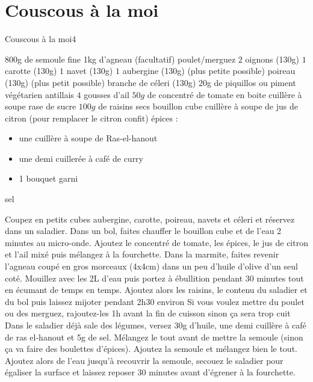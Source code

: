 {\section{Couscous à la moi}
\begin{recette}{Couscous à la moi}{4}{}{}
\begin{ingredients}[8 pers.]
\ingredient 800g de semoule fine
\ingredient 1kg d'agneau
\ingredient (facultatif) poulet/merguez
\ingredient $2$ oignons (130g)
\ingredient $1$ carotte (130g)
\ingredient $1$ navet (130g)
\ingredient $1$ aubergine (130g) (plus petite possible)
 poireau (130g)  (plus petit possible)
 branche de céleri (130g)
\ingredient[falcultatif] 20g de piquillos ou piment végétarien antillais
\ingredient $4$ gousses d'ail
\ingredient $50\unit{g}$ de concentré de tomate en boite %
 cuillère à soupe rase de sucre
\ingredient $100\unit{g}$ de raisins secs
 bouillon cube
 cuillère à soupe de jus de citron (pour remplacer le citron confit)
\ingredient épices : \begin{itemize}
		\item une cuillère à soupe de Ras-el-hanout
		\item une demi cuillerée à café de curry
		\item 1 bouquet garni
		\end{itemize}
\ingredient sel
\end{ingredients}

\begin{preparation}
\etape Coupez en petits cubes aubergine, carotte, poireau, navets et céleri et réservez dans un saladier.
\etape Dans un bol, faites chauffer le bouillon cube et de l'eau 2 minutes au micro-onde. Ajoutez le concentré de tomate, les épices, le jus de citron et l'ail mixé puis mélangez à la fourchette. 
\etape Dans la marmite, faites revenir l'agneau coupé en gros morceaux (4x4cm) dans un peu d'huile d'olive d'un seul coté.
\etape Mouillez avec les 2L d'eau puis portez à ébullition pendant 30 minutes tout en écumant de temps en temps. 
\etape Ajoutez alors les raisins, le contenu du saladier et du bol puis laissez mijoter pendant 2h30 environ
\etape Si vous voulez mettre du poulet ou des merguez, rajoutez-les 1h avant la fin de cuisson sinon ça sera trop cuit
\etape Dans le saladier déjà sale des légumes, versez 30g d'huile, une demi cuillère à café de ras el-hanout et 5g de sel. Mélangez le tout avant de mettre la semoule (sinon ça va faire des boulettes d'épices).
\etape Ajoutez la semoule et mélangez bien le tout. 
\etape Ajoutez alors de l'eau jusqu'à recouvrir la semoule, secouez le saladier pour égaliser la surface et laissez reposer 30 minutes avant d'égrener à la fourchette.
\end{preparation}
\end{recette}


}
